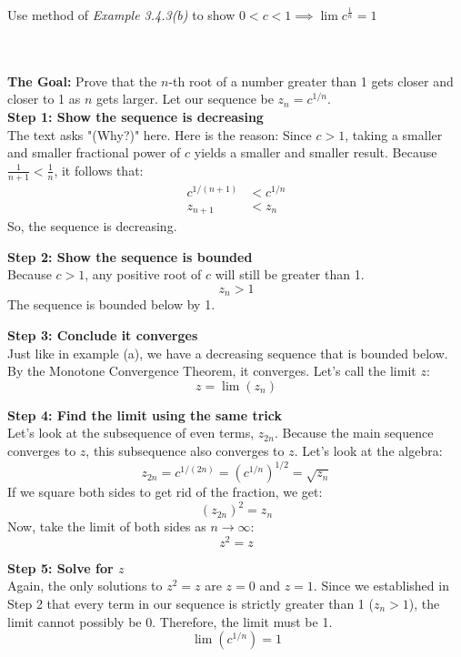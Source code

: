 \documentclass[../main.tex]{subfiles}
\begin{document}
{Use method of \textit{Example 3.4.3(b)} to show $0<c<1 \implies  \lim c^{\frac{1}{n}}=1$ }
{\\\\ \textbf{The Goal:} Prove that the $n$-th root of a number greater than 1 gets closer and closer to 1 as $n$ gets larger. Let our sequence be $z_n = c^{1/n}$. \\

\textbf{Step 1: Show the sequence is decreasing}\\
The text asks "(Why?)" here. Here is the reason: Since $c > 1$, taking a smaller and smaller fractional power of $c$ yields a smaller and smaller result. Because $\frac{1}{n+1} < \frac{1}{n}$, it follows that:
\begin{align*}
    c^{1/(n+1)} &< c^{1/n} \\
    z_{n+1} &< z_n
\end{align*}
So, the sequence is decreasing.

\textbf{Step 2: Show the sequence is bounded}\\
Because $c > 1$, any positive root of $c$ will still be greater than 1.
\begin{equation*}
    z_n > 1
\end{equation*}
The sequence is bounded below by 1.

\textbf{Step 3: Conclude it converges}\\
Just like in example (a), we have a decreasing sequence that is bounded below. By the Monotone Convergence Theorem, it converges. Let's call the limit $z$:
\begin{equation*}
    z = \lim(z_n)
\end{equation*}

\textbf{Step 4: Find the limit using the same trick}\\
Let's look at the subsequence of even terms, $z_{2n}$. Because the main sequence converges to $z$, this subsequence also converges to $z$. Let's look at the algebra:
\begin{equation*}
    z_{2n} = c^{1/(2n)} = (c^{1/n})^{1/2} = \sqrt{z_n}
\end{equation*}
If we square both sides to get rid of the fraction, we get:
\begin{equation*}
    (z_{2n})^2 = z_n
\end{equation*}
Now, take the limit of both sides as $n \to \infty$:
\begin{equation*}
    z^2 = z
\end{equation*}

\textbf{Step 5: Solve for $z$}\\
Again, the only solutions to $z^2 = z$ are $z = 0$ and $z = 1$. Since we established in Step 2 that every term in our sequence is strictly greater than 1 ($z_n > 1$), the limit cannot possibly be 0. Therefore, the limit must be 1.
\begin{equation*}
    \lim(c^{1/n}) = 1
\end{equation*}}

\[
\] 
\end{document}
